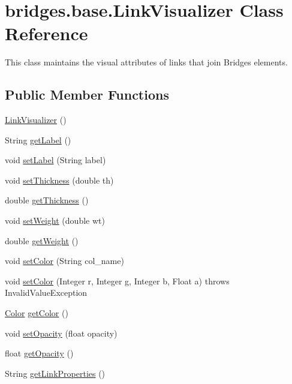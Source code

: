 \hypertarget{classbridges_1_1base_1_1_link_visualizer}{}\section{bridges.\+base.\+Link\+Visualizer Class Reference}
\label{classbridges_1_1base_1_1_link_visualizer}


This class maintains the visual attributes of links that join Bridges elements.  


\subsection*{Public Member Functions}
\begin{DoxyCompactItemize}
\item 
\mbox{\hyperlink{classbridges_1_1base_1_1_link_visualizer_a0b69f099fa264ae9097b0efe278c6a1b}{Link\+Visualizer}} ()
\item 
String \mbox{\hyperlink{classbridges_1_1base_1_1_link_visualizer_a9ed60a0f8a337cd2c98b2d6ab07b8601}{get\+Label}} ()
\item 
void \mbox{\hyperlink{classbridges_1_1base_1_1_link_visualizer_a073d84e04dd95c3848c9f4e0ad74eb77}{set\+Label}} (String label)
\item 
void \mbox{\hyperlink{classbridges_1_1base_1_1_link_visualizer_a702e9ca345d1a4a035baf2041f275849}{set\+Thickness}} (double th)
\item 
double \mbox{\hyperlink{classbridges_1_1base_1_1_link_visualizer_af1592d2a8664b00c1a51fdc0f8d1860a}{get\+Thickness}} ()
\item 
void \mbox{\hyperlink{classbridges_1_1base_1_1_link_visualizer_a21d5884d243cf5a08f9d544f5083a44c}{set\+Weight}} (double wt)
\item 
double \mbox{\hyperlink{classbridges_1_1base_1_1_link_visualizer_ac96d7fb118ae6c7e1bdd57c5e2c8639a}{get\+Weight}} ()
\item 
void \mbox{\hyperlink{classbridges_1_1base_1_1_link_visualizer_a92f306dbd73b961befa8ab4c0620a89e}{set\+Color}} (String col\+\_\+name)
\item 
void \mbox{\hyperlink{classbridges_1_1base_1_1_link_visualizer_a003905cfe33e1704555b2b3a1cf99bad}{set\+Color}} (Integer r, Integer g, Integer b, Float a)  throws Invalid\+Value\+Exception 
\item 
\mbox{\hyperlink{classbridges_1_1base_1_1_color}{Color}} \mbox{\hyperlink{classbridges_1_1base_1_1_link_visualizer_a3ed52d98ecab99c6d8dd136fba913b7d}{get\+Color}} ()
\item 
void \mbox{\hyperlink{classbridges_1_1base_1_1_link_visualizer_ac0d59614dbc65ed0a19c25c493a1deaa}{set\+Opacity}} (float opacity)
\item 
float \mbox{\hyperlink{classbridges_1_1base_1_1_link_visualizer_a07cdd435a54e4b612ad63614f2a27a4a}{get\+Opacity}} ()
\item 
String \mbox{\hyperlink{classbridges_1_1base_1_1_link_visualizer_ab64d9b7e2b99f7ebce80cbabfe4adf2a}{get\+Link\+Properties}} ()
\end{DoxyCompactItemize}


